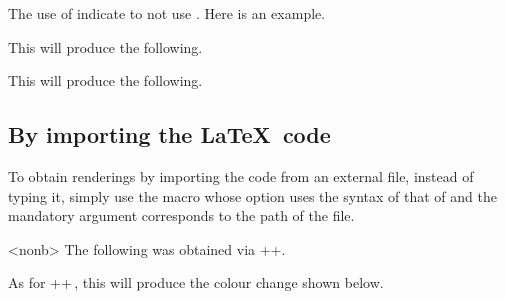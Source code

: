 \begin{tdocexa}
    The use of  indicate to not use .
    Here is an example.



    This will produce the following.

    \medskip

    

\end{tdocexa}




\begin{tdocexa}
    \leavevmode



    This will produce the following.

    \medskip

    

\end{tdocexa}


\subsection{By importing the \LaTeX\ code}

To obtain renderings by importing the code from an external file, instead of typing it, simply use the  macro whose option uses the syntax of that of  and the mandatory argument corresponds to the path of the file.


\begin{tdocexa}<nonb>
    The following was obtained via \tdocinlatex++.

    \medskip



    \medskip

    As for \tdocinlatex++\,, this will produce the colour change shown below.

    \medskip


\end{tdocexa}


